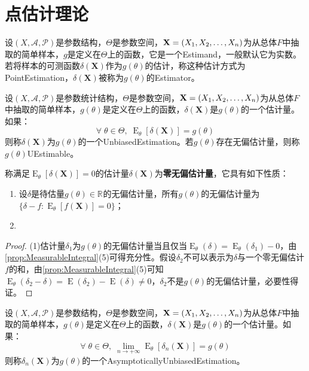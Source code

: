 \chapter{点估计理论}

\begin{definition}
	设$(X,\mathscr{A},\mathscr{P})$是参数结构，$\Theta$是参数空间，$\mathbf{X}=(X_1, X_2, \dots, X_{n})$为从总体$F$中抽取的简单样本，$g$是定义在$\Theta$上的函数，它是一个\gls{Estimand}，一般默认它为实数。若将样本的可测函数$\delta(\mathbf{X})$作为$g(\theta)$的估计，称这种估计方式为\gls{PointEstimation}，$\delta(\mathbf{X})$被称为$g(\theta)$的\gls{Estimator}。
\end{definition}
\begin{definition}
	设$(X,\mathscr{A},\mathscr{P})$是参数统计结构，$\Theta$是参数空间，$\mathbf{X}=(X_1, X_2, \dots, X_{n})$为从总体$F$中抽取的简单样本，$g(\theta)$是定义在$\Theta$上的函数，$\delta(\mathbf{X})$是$g(\theta)$的一个估计量。如果：
	\begin{equation*}
		\forall\;\theta\in\Theta,\;\operatorname{E}_{\theta}[\delta(\mathbf{X})]=g(\theta)
	\end{equation*}
	则称$\delta(\mathbf{X})$为$g(\theta)$的一个\gls{UnbiasedEstimation}。若$g(\theta)$存在无偏估计量，则称$g(\theta)$\gls{UEstimable}。
\end{definition}
\begin{property}\label{prop:0UnbiasedEstimator}
	称满足$\operatorname{E}_{\theta}[\delta(\mathbf{X})]=0$的估计量$\delta(\mathbf{X})$为\textbf{零无偏估计量}，它具有如下性质：
	\begin{enumerate}
		\item 设$\delta$是待估量$g(\theta)\in\mathbb{R}^{}$的无偏估计量，所有$g(\theta)$的无偏估计量为$\{\delta-f:\operatorname{E}_{\theta}[f(\mathbf{X})]=0\}$；
		\item 
	\end{enumerate}
\end{property}
\begin{proof}
	(1)估计量$\delta_1$为$g(\theta)$的无偏估计量当且仅当$\operatorname{E}_{\theta}(\delta)=\operatorname{E}_{\theta}(\delta_1)-0$，由\cref{prop:MeasurableIntegral}(5)可得充分性。假设$\delta_2$不可以表示为$\delta$与一个零无偏估计$f$的和，由\cref{prop:MeasurableIntegral}(5)可知$\operatorname{E}_{\theta}(\delta_2-\delta)=\operatorname{E}(\delta_2)-\operatorname{E}(\delta)\ne0$，$\delta_2$不是$g(\theta)$的无偏估计量，必要性得证。
\end{proof}
\begin{definition}
	设$(X,\mathscr{A},\mathscr{P})$是参数结构，$\Theta$是参数空间，$\mathbf{X}=(X_1, X_2, \dots, X_{n})$为从总体$F$中抽取的简单样本，$g(\theta)$是定义在$\Theta$上的函数，$\delta(\mathbf{X})$是$g(\theta)$的一个估计量。如果：
	\begin{equation*}
		\forall\;\theta\in\Theta,\;\lim_{n\to+\infty}\operatorname{E}_{\theta}[\delta_n(\mathbf{X})]=g(\theta)
	\end{equation*}
	则称$\delta_n(\mathbf{X})$为$g(\theta)$的一个\gls{AsymptoticallyUnbiasedEstimation}。
\end{definition}
